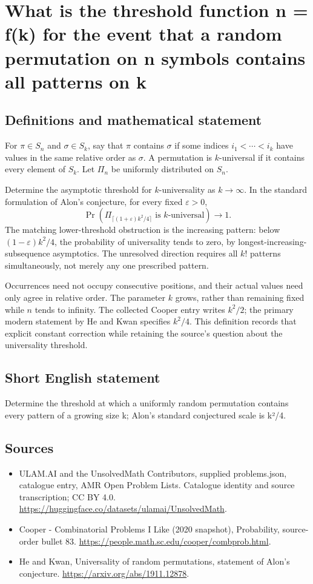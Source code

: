 \documentclass[11pt,a4paper]{article}
\begin{document}
\section*{What is the threshold function n = f(k) for the event that a random permutation on n symbols contains all patterns on k}\label{statement}

\subsection{Definitions and mathematical statement}
For $\pi\in S_n$ and $\sigma\in S_k$, say that $\pi$ contains
$\sigma$ if some indices $i_1<\cdots<i_k$ have values in the
same relative order as $\sigma$. A permutation is $k$-universal
if it contains every element of $S_k$. Let $\Pi_n$ be uniformly
distributed on $S_n$.

Determine the asymptotic threshold for $k$-universality as
$k\to\infty$. In the standard formulation of Alon's conjecture,
for every fixed $\varepsilon>0$,
\[
 \Pr\!\left(\Pi_{\lceil(1+\varepsilon)k^2/4\rceil}
                 \text{ is }k\text{-universal}\right)\longrightarrow1.
\]
The matching lower-threshold obstruction is the increasing
pattern: below $(1-\varepsilon)k^2/4$, the probability of
universality tends to zero, by longest-increasing-subsequence
asymptotics. The unresolved direction requires all $k!$ patterns
simultaneously, not merely any one prescribed pattern.

Occurrences need not occupy consecutive positions, and their
actual values need only agree in relative order. The parameter
$k$ grows, rather than remaining fixed while $n$ tends to infinity.
The collected Cooper entry writes $k^2/2$; the primary modern
statement by He and Kwan specifies $k^2/4$. This definition records
that explicit constant correction while retaining the source's
question about the universality threshold.
\subsection{Short English statement}
Determine the threshold at which a uniformly random permutation contains every pattern of a growing size k; Alon’s standard conjectured scale is k²/4.
\subsection{Sources}
\begin{itemize}
\item[S1] ULAM.AI and the UnsolvedMath Contributors, supplied problems.json, catalogue entry, AMR Open Problem Lists. Catalogue identity and source transcription; CC BY 4.0.
\url{https://huggingface.co/datasets/ulamai/UnsolvedMath}.
\item[S2] Cooper - Combinatorial Problems I Like (2020 snapshot), Probability, source-order bullet 83. 
\url{https://people.math.sc.edu/cooper/combprob.html}.
\item[S3] He and Kwan, Universality of random permutations, statement of Alon’s conjecture.
\url{https://arxiv.org/abs/1911.12878}.
\end{itemize}
\end{document}
